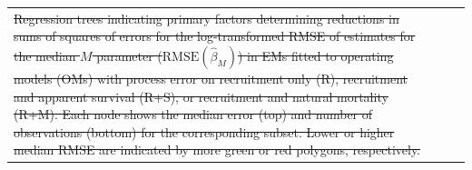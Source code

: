 \documentclass[
  12pt,
]{article}
\makeatletter
\providecommand{\DIFdel}[1]{{\protect\color{red}\sout{#1}}} %
\providecommand{\DIFdelFL}[1]{\DIFdel{#1}} %
\let\sout@orig\sout %
\renewcommand{\sout}[1]{\ifmmode\text{\sout@orig{\ensuremath{#1}}}\else\sout@orig{#1}\fi} %
\makeatother
\begin{document}
\begin{table}
{\begin{center}
\begin{tabular}{lrrr}
{%
\DIFdelFL{Regression trees indicating primary factors determining reductions in sums of squares of errors for the log-transformed RMSE of estimates for the median $M$ parameter ($\text{RMSE}\left(\widehat \beta_M\right)$) in EMs fitted to operating models (OMs) with process error on recruitment only (R), recruitment and apparent survival (R+S), or recruitment and natural mortality (R+M). Each node shows the median error (top) and number of observations (bottom) for the corresponding subset. Lower or higher median RMSE are indicated by more green or red polygons, respectively.}}%


\end{tabular}
\end{center}}
\end{table}
\end{document}
